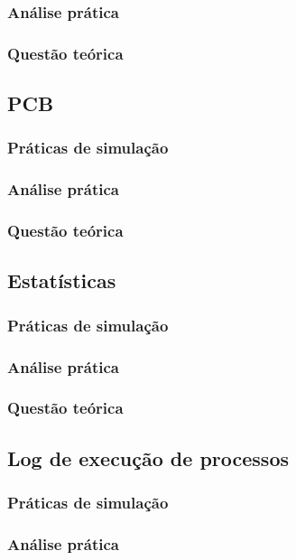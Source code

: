 \documentclass[a4paper,12pt]{article} %
\begin{document}
\subsubsection[]{Análise prática}
\subsubsection[]{Questão teórica}

\subsection[]{PCB}
\subsubsection[]{Práticas de simulação}
\subsubsection[]{Análise prática}
\subsubsection[]{Questão teórica}

\subsection[]{Estatísticas}
\subsubsection[]{Práticas de simulação}
\subsubsection[]{Análise prática}
\subsubsection[]{Questão teórica}

\subsection[]{Log de execução de processos}
\subsubsection[]{Práticas de simulação}
\subsubsection[]{Análise prática}
\end{document}
